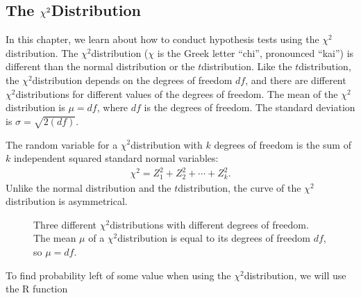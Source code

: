 \documentclass[letterpaper,10pt,english]{jupyterBook}
\begin{document}
\subsection{The \protect\(\chi^2\protect\)\sphinxhyphen{}Distribution}
\label{\detokenize{Ch7 The Chi-Square Distribution/7.1 The Chi-Square Distribution:id1}}
\sphinxAtStartPar
In this chapter, we learn about how to conduct hypothesis tests using the \(\chi^2\)\sphinxhyphen{}distribution. The \(\chi^2\)\sphinxhyphen{}distribution (\(\chi\) is the Greek letter “chi”, pronounced “kai”) is different than the normal distribution or the \(t\)\sphinxhyphen{}distribution. Like the \(t\)\sphinxhyphen{}distribution, the \(\chi^2\)\sphinxhyphen{}distribution depends on the degrees of freedom \(df\), and there are different \(\chi^2\)\sphinxhyphen{}distributions for different values of the degrees of freedom. The mean of the \(\chi^2\)\sphinxhyphen{}distribution is \(\mu = df\), where \(df\) is the degrees of freedom. The standard deviation is \(\sigma = \sqrt{2(df)}\).

\sphinxAtStartPar
The random variable for a \(\chi^2\)\sphinxhyphen{}distribution with \(k\) degrees of freedom is the sum of \(k\) independent squared standard normal variables:
\begin{equation*}
\begin{split} \chi^2 = Z_1^2 + Z_2^2 + \cdots + Z_k^2. \end{split}
\end{equation*}
\sphinxAtStartPar
Unlike the normal distribution and the \(t\)\sphinxhyphen{}distribution, the curve of the \(\chi^2\)\sphinxhyphen{}distribution is asymmetrical.

\begin{figure}[htbp]
\centering
\capstart

\noindent{}
\caption{Three different \(\chi^2\)\sphinxhyphen{}distributions with different degrees of freedom. The mean \(\mu\) of a \(\chi^2\)\sphinxhyphen{}distribution is equal to its degrees of freedom \(df\), so \(\mu = df\).}\label{\detokenize{Ch7 The Chi-Square Distribution/7.1 The Chi-Square Distribution:chisq-diff-df}}\end{figure}

\sphinxAtStartPar
To find probability left of some value when using the \(\chi^2\)\sphinxhyphen{}distribution, we will use the R function

\begin{sphinxVerbatim}[commandchars=\\\{\}]
\end{sphinxVerbatim}
\end{document}
